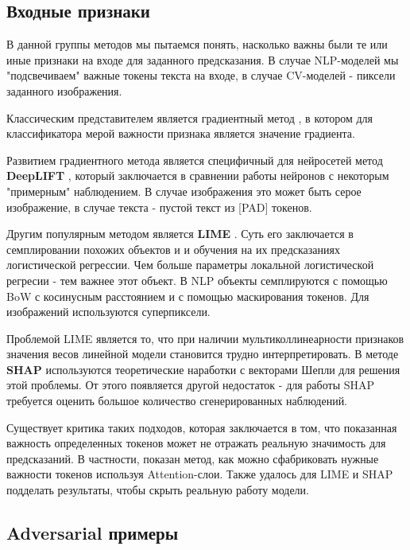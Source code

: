 \subsection{Входные признаки}

В данной группы методов мы пытаемся понять, насколько важны были те или иные признаки на входе для заданного предсказания. В случае NLP-моделей мы "подсвечиваем" важные токены текста на входе, в случае CV-моделей - пиксели заданного изображения.

Классическим представителем является градиентный метод \cite{baehrensHowExplainIndividual2009}, в котором для классификатора мерой важности признака является значение градиента.

Развитием градиентного метода является специфичный для нейросетей метод \textbf{DeepLIFT} \cite{shrikumarLearningImportantFeatures2019}, который заключается в сравнении работы нейронов с некоторым "примерным" наблюдением. В случае изображения это может быть серое изображение, в случае текста - пустой текст из [PAD] токенов. 

Другим популярным методом является \textbf{LIME} \cite{ribeiroWhyShouldTrust2016}. Суть его заключается в семплировании похожих объектов и и обучения на их предсказаниях логистической регрессии. Чем больше параметры локальной логистической регресии - тем важнее этот объект. В NLP объекты семплируются с помощью BoW с косинусным расстоянием и с помощью маскирования токенов. Для изображений используются суперпиксели.

Проблемой LIME является то, что при наличии мультиколлинеарности признаков значения весов линейной модели становится трудно интерпретировать. В методе \textbf{SHAP} \cite{lundbergUnifiedApproachInterpreting2017} используются теоретические наработки с векторами Шепли для решения этой проблемы. От этого появляется другой недостаток - для работы SHAP требуется оценить большое количество сгенерированных наблюдений.

Существует критика таких подходов, которая заключается в том, что показанная важность определенных токенов может не отражать реальную значимость для предсказаний. В частности, \cite{pruthiLearningDeceiveAttentionBased2020a} показан метод, как можно сфабриковать нужные важности токенов используя Attention-слои. Также \cite{slackFoolingLIMESHAP2020} удалось для LIME и SHAP подделать результаты, чтобы скрыть реальную работу модели.

\vspace{8mm}
\subsection{Adversarial примеры}


